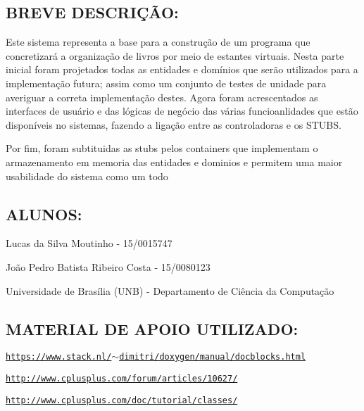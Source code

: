 \subsection*{B\+R\+E\+VE D\+E\+S\+C\+R\+IÇÃO\+:}

Este sistema representa a base para a construção de um programa que concretizará a organização de livros por meio de estantes virtuais. Nesta parte inicial foram projetados todas as entidades e domínios que serão utilizados para a implementação futura; assim como um conjunto de testes de unidade para averiguar a correta implementação destes. Agora foram acrescentados as interfaces de usuário e das lógicas de negócio das várias funcioanlidades que estão disponíveis no sistemas, fazendo a ligação entre as controladoras e os S\+T\+U\+BS.

Por fim, foram subtituidas as stubs pelos containers que implementam o armazenamento em memoria das entidades e dominios e permitem uma maior usabilidade do sistema como um todo

\subsection*{A\+L\+U\+N\+OS\+:}


\begin{DoxyItemize}
\item Lucas da Silva Moutinho -\/ 15/0015747
\item João Pedro Batista Ribeiro Costa -\/ 15/0080123
\item Universidade de Brasília (U\+NB) -\/ Departamento de Ciência da Computação
\end{DoxyItemize}

\subsection*{M\+A\+T\+E\+R\+I\+AL DE A\+P\+O\+IO U\+T\+I\+L\+I\+Z\+A\+DO\+:}


\begin{DoxyItemize}
\item \href{https://www.stack.nl/~dimitri/doxygen/manual/docblocks.html}{\tt https\+://www.\+stack.\+nl/$\sim$dimitri/doxygen/manual/docblocks.\+html}
\item \href{http://www.cplusplus.com/forum/articles/10627/}{\tt http\+://www.\+cplusplus.\+com/forum/articles/10627/}
\item \href{http://www.cplusplus.com/doc/tutorial/classes/}{\tt http\+://www.\+cplusplus.\+com/doc/tutorial/classes/} 
\end{DoxyItemize}